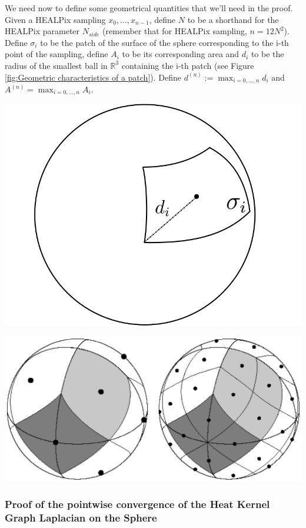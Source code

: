 We need now to define some geometrical quantities that we'll need in the proof.
Given a HEALPix sampling $x_0, ..., x_{n-1}$, define $N$ to be a shorthand for the HEALPix parameter $N_{side}$ (remember that for HEALPix sampling, $n=12N^2$). Define $\sigma_i$ to be the patch of the surface of the sphere corresponding to the i-th point of the sampling, define $A_i$ to be its corresponding area and $d_i$ to be the radius of the smallest ball in $\mathbb R^3$ containing the i-th patch (see Figure \ref{fig:Geometric characteristics of a patch}). Define $d^{(n)} := \max_{i=0, ..., n}d_i$ and $A^{(n)}=\max_{i=0, ..., n}A_i$.\\

\begin{minipage}{.5\textwidth}
	\centering
	\includegraphics[width=0.4\linewidth]{figs/chapter1/d_iA_i.jpg}
\end{minipage}%
\begin{minipage}{.5\textwidth}
	\centering
	\includegraphics[width=0.7\linewidth]{figs/chapter1/Heal_Base.png}
	\vspace{0.5cm}
\end{minipage}

\subsubsection{Proof of the pointwise convergence of the Heat Kernel Graph Laplacian on the Sphere}

